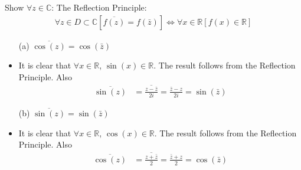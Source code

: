 \documentclass[12pt, english]{book}
\makeatletter
\renewenvironment{proof}[1][\proofname]{\par
	\pushQED{\qed}%
	\normalfont \topsep6\p@\@plus6\p@\relax
	\list{}{%
		\settowidth{\leftmargin}{\itshape\proofname:\hskip\labelsep}%
		\setlength{\labelwidth}{0pt}%
		\setlength{\itemindent}{-\leftmargin}%
		}%
	\item[\hskip\labelsep\itshape#1\@addpunct{:}]\ignorespaces
	}{\popQED\endlist\@endpefalse}
\makeatother
\begin{document}
	\begin{example}
		Show \(\forall z \in \mathbb{C}\):\newline
		The Reflection Principle:
		\begin{align*}
			\forall z \in D\subset \mathbb{C} [\overline{f(z)} = f(\bar{z})] \iff \forall x \in \mathbb{R}[f(x) \in \mathbb{R}]
		\end{align*}
		\begin{itemize}
			\item[(a)] \(\overline{\cos(z)} = \cos(\bar{z})\) 
			\begin{proof}
			{\color{Grey}
				It is clear that \(\forall x \in \mathbb{R}\), \(\sin(x) \in \mathbb{R}\). The result follows from the Reflection Principle. Also
				\begin{align*}
					\overline{\sin(z)} &= \overline{\frac{z - \bar{z}}{2i}} = \frac{\bar{z} 
						- z}{2i} = \sin(\bar{z})
				\end{align*}
			}
			\end{proof}
			
			\item[(b)] \(\overline{\sin(z)} = \sin(\bar{z})\) 
			\begin{proof}
			{\color{Grey}
				It is clear that \(\forall x \in \mathbb{R}\), \(\cos(x) \in \mathbb{R}\). The result follows from the Reflection Principle. Also
				\begin{align*}
					\overline{\cos(z)} &= \overline{\frac{z + \bar{z}}{2}} = \frac{\bar{z} 
						+ z}{2} = \cos(\bar{z})
				\end{align*}
			}
			\end{proof}
		\end{itemize}
	\end{example}
\end{document}
